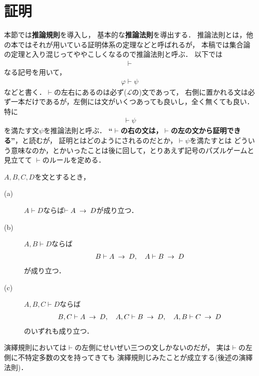 \section{証明}
	本節では{\bf 推論規則}を導入し，
	基本的な{\bf 推論法則}を導出する．
	推論法則とは，他の本ではそれが用いている証明体系の定理などと呼ばれるが，
	本稿では集合論の定理と入り混じってややこしくなるので推論法則と呼ぶ．
	以下では
	\begin{align}
		\vdash
	\end{align}
	なる記号を用いて，
	\begin{align}
		\varphi \vdash \psi
	\end{align}
	などと書く．$\vdash$の左右にあるのは必ず($\mathcal{L}$の)文であって，
	右側に置かれる文は必ず一本だけであるが，左側には文がいくつあっても良いし，全く無くても良い．
	特に
	\begin{align}
		\vdash \psi
	\end{align}
	を満たす文$\psi$を推論法則と呼ぶ．
	{\bf ``$\vdash$の右の文は，$\vdash$の左の文から証明できる''}，と読むが，
	証明とはどのようにされるのだとか，$\vdash \psi$を満たすとは
	どういう意味なのか，とかいったことは後に回して，とりあえず記号のパズルゲームと見立てて
	$\vdash$のルールを定める．
	
	\begin{screen}
		\begin{logicalaxm}[演繹規則]\label{logicalaxm:deduction_rule}
			$A,B,C,D$を文とするとき，
			\begin{description}
				\item[(a)] $A \vdash D$ならば$\vdash A \hspace{0.25em}\rightarrow\hspace{0.25em} D$が成り立つ．
				\item[(b)] $A,B \vdash D$ならば
					\begin{align}
						B \vdash A \hspace{0.25em}\rightarrow\hspace{0.25em} D,\quad
						A \vdash B \hspace{0.25em}\rightarrow\hspace{0.25em} D
					\end{align}
					が成り立つ．
				\item[(c)] $A,B,C \vdash D$ならば
					\begin{align}
						B,C \vdash A \hspace{0.25em}\rightarrow\hspace{0.25em} D,\quad
						A,C \vdash B \hspace{0.25em}\rightarrow\hspace{0.25em} D,\quad
						A,B \vdash C \hspace{0.25em}\rightarrow\hspace{0.25em} D
					\end{align}
					のいずれも成り立つ．
			\end{description}
		\end{logicalaxm}
	\end{screen}
	
	演繹規則においては$\vdash$の左側にせいぜい三つの文しかないのだが，
	実は$\vdash$の左側に不特定多数の文を持ってきても
	演繹規則じみたことが成立する(後述の演繹法則)．
	
